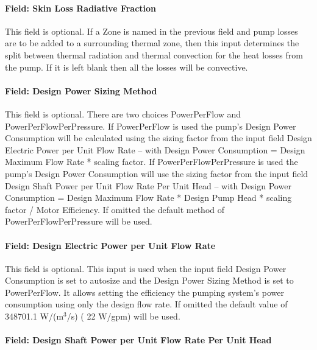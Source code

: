 \paragraph{Field: Skin Loss Radiative Fraction}\label{field-skin-loss-radiative-fraction-3}

This field is optional. If a Zone is named in the previous field and pump losses are to be added to a surrounding thermal zone, then this input determines the split between thermal radiation and thermal convection for the heat losses from the pump. If it is left blank then all the losses will be convective.

\paragraph{Field: Design Power Sizing Method}\label{field-design-power-sizing-method-3}

This field is optional. There are two choices PowerPerFlow and PowerPerFlowPerPressure. If PowerPerFlow is used the pump's Design Power Consumption will be calculated using the sizing factor from the input field Design Electric Power per Unit Flow Rate -- with Design Power Consumption = Design Maximum Flow Rate * scaling factor. If PowerPerFlowPerPressure is used the pump's Design Power Consumption will use the sizing factor from the input field Design Shaft Power per Unit Flow Rate Per Unit Head -- with Design Power Consumption = Design Maximum Flow Rate * Design Pump Head * scaling factor / Motor Efficiency. If omitted the default method of PowerPerFlowPerPressure will be used.

\paragraph{Field: Design Electric Power per Unit Flow Rate}\label{field-design-electric-power-per-unit-flow-rate-2}

This field is optional. This input is used when the input field Design Power Consumption is set to autosize and the Design Power Sizing Method is set to PowerPerFlow. It allows setting the efficiency the pumping system's power consumption using only the design flow rate. If omitted the default value of 348701.1 W/(m\(^{3}\)/s) ( 22 W/gpm) will be used.

\paragraph{Field: Design Shaft Power per Unit Flow Rate Per Unit Head}\label{field-design-shaft-power-per-unit-flow-rate-per-unit-head-3}

